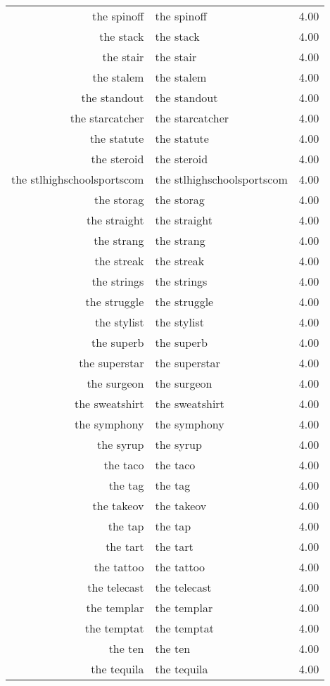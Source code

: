 \begin{table}[ht]
\begin{tabular}{rlr}
  the spinoff & the spinoff & 4.00 \\ 
  the stack & the stack & 4.00 \\ 
  the stair & the stair & 4.00 \\ 
  the stalem & the stalem & 4.00 \\ 
  the standout & the standout & 4.00 \\ 
  the starcatcher & the starcatcher & 4.00 \\ 
  the statute & the statute & 4.00 \\ 
  the steroid & the steroid & 4.00 \\ 
  the stlhighschoolsportscom & the stlhighschoolsportscom & 4.00 \\ 
  the storag & the storag & 4.00 \\ 
  the straight & the straight & 4.00 \\ 
  the strang & the strang & 4.00 \\ 
  the streak & the streak & 4.00 \\ 
  the strings & the strings & 4.00 \\ 
  the struggle & the struggle & 4.00 \\ 
  the stylist & the stylist & 4.00 \\ 
  the superb & the superb & 4.00 \\ 
  the superstar & the superstar & 4.00 \\ 
  the surgeon & the surgeon & 4.00 \\ 
  the sweatshirt & the sweatshirt & 4.00 \\ 
  the symphony & the symphony & 4.00 \\ 
  the syrup & the syrup & 4.00 \\ 
  the taco & the taco & 4.00 \\ 
  the tag & the tag & 4.00 \\ 
  the takeov & the takeov & 4.00 \\ 
  the tap & the tap & 4.00 \\ 
  the tart & the tart & 4.00 \\ 
  the tattoo & the tattoo & 4.00 \\ 
  the telecast & the telecast & 4.00 \\ 
  the templar & the templar & 4.00 \\ 
  the temptat & the temptat & 4.00 \\ 
  the ten & the ten & 4.00 \\ 
  the tequila & the tequila & 4.00 \\ 

\end{tabular}
\end{table}
